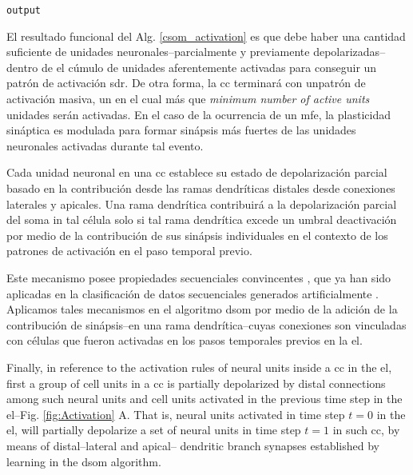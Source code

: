{\begin{algorithm}
\begin{algorithmic}[1]
	\ENDIF

	\ENDFOR

	\RETURN \texttt{output}
\end{algorithmic}
\end{algorithm}

El resultado funcional del Alg. \ref{csom_activation} es que debe haber una cantidad suficiente de unidades neuronales--parcialmente y previamente depolarizadas--dentro de el cúmulo de unidades aferentemente activadas para conseguir un patrón de activación \gls{sdr}. De otra forma, la \gls{cc} terminará con unpatrón de activación masiva, un  en el cual más que \emph{minimum number of active units} unidades serán activadas.
En el caso de la ocurrencia de un \gls{mfe}, la plasticidad sináptica es modulada para formar sinápsis más fuertes de las unidades neuronales activadas durante tal evento.

Cada unidad neuronal en una \gls{cc} establece su estado de depolarización parcial basado en la contribución desde
las ramas dendríticas distales desde conexiones laterales y apicales.
Una rama dendrítica contribuirá a la depolarización parcial del soma in tal célula solo si tal
rama dendrítica excede un umbral deactivación por medio de la contribución de sus sinápsis individuales
en el contexto de los patrones de activación en el paso temporal previo.

Este mecanismo posee propiedades secuenciales convincentes \cite{hawkins_2016},
que ya han sido aplicadas en la clasificación de datos secuenciales generados artificialmente \cite{cui_2016}.
Aplicamos tales mecanismos en el algoritmo \gls{dsom} por medio de la adición de la contribución de sinápsis--en una rama dendrítica--cuyas conexiones
son vinculadas con células que fueron activadas en los pasos temporales previos en la \gls{el}.
}{
Finally, in reference to the activation rules of neural units inside a \gls{cc} in the \gls{el},
first a group of cell units in a \gls{cc} is partially depolarized 
by distal connections among such neural units and cell units activated in the
previous time step in the \gls{el}--Fig. \ref{fig:Activation} A.
That is, neural units activated in time step $t=0$ in the \gls{el}, will partially depolarize
a set of neural units in time step $t=1$ in such \gls{cc}, by means of distal--lateral and apical--
dendritic branch synapses established by learning in the \gls{dsom} algorithm.

}
